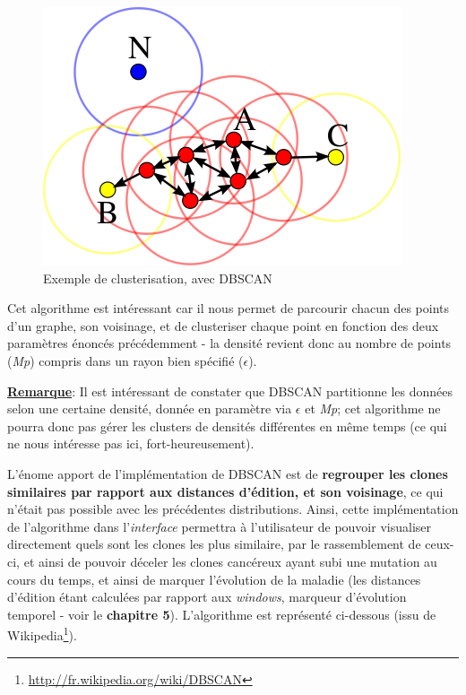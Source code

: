 \documentclass[pdftex,12pt,a4paper]{report}
\begin{document}
\begin{spacing}{1.2}
\begin{figure}[H]
\begin{center}
	\includegraphics[scale=0.45]{img/400px-DBSCAN-Illustration.png}
\end{center}
\caption{Exemple de clusterisation, avec DBSCAN}
\end{figure}

Cet algorithme est intéressant car il nous permet de parcourir chacun des points d'un graphe, son voisinage, et de clusteriser chaque point en fonction des deux paramètres énoncés précédemment - la densité revient donc au nombre de points (\textit{Mp}) compris dans un rayon bien spécifié ($\epsilon$).

\textbf{\underline{Remarque}}: Il est intéressant de constater que DBSCAN partitionne les données selon une certaine densité, donnée en paramètre via $\epsilon$ et \textit{Mp}; cet algorithme ne pourra donc pas gérer les clusters de densités différentes en même temps (ce qui ne nous intéresse pas ici, fort-heureusement).

L'énome apport de l'implémentation de DBSCAN est de \textbf{regrouper les clones similaires par rapport aux distances d'édition, et son voisinage}, ce qui n'était pas possible avec les précédentes distributions.
Ainsi, cette implémentation de l'algorithme dans l'\textit{interface} permettra à l'utilisateur de pouvoir visualiser directement quels sont les clones les plus similaire, par le rassemblement de ceux-ci, et ainsi de pouvoir déceler les clones cancéreux ayant subi une mutation au cours du temps, et ainsi de marquer l'évolution de la maladie (les distances d'édition étant calculées par rapport aux \textit{windows}, marqueur d'évolution temporel - voir le \textbf{chapitre 5}).
\newline
L'algorithme est représenté ci-dessous (issu de Wikipedia\footnote{\url{http://fr.wikipedia.org/wiki/DBSCAN}}).


\end{spacing}
\end{document}
